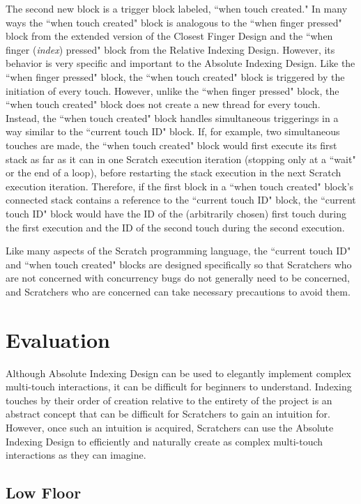 The second new block is a trigger block labeled, ``when touch created." In many ways  the ``when touch created" block is analogous to the ``when finger pressed" block from the extended version of the Closest Finger Design and the ``when finger (\emph{index}) pressed" block from the Relative Indexing Design. However, its behavior is very specific and important to the Absolute Indexing Design. Like the ``when finger pressed" block, the ``when touch created" block is triggered by the initiation of every touch. However, unlike the ``when finger pressed" block, the ``when touch created" block does not create a new thread for every touch. Instead, the ``when touch created" block handles simultaneous triggerings in a way similar to the ``current touch ID" block. If, for example, two simultaneous touches are made, the ``when touch created" block would first execute its first stack as far as it can in one Scratch execution iteration (stopping only at a ``wait" or the end of a loop), before restarting the stack execution in the next Scratch execution iteration. Therefore, if the first block in a ``when touch created" block's connected stack contains a reference to the ``current touch ID" block, the ``current touch ID" block would have the ID of the (arbitrarily chosen) first touch during the first execution and the ID of the second touch during the second execution.

Like many aspects of the Scratch programming language, the ``current touch ID" and ``when touch created" blocks are designed specifically so that Scratchers who are not concerned with concurrency bugs do not generally need to be concerned, and Scratchers who are concerned can take necessary precautions to avoid them.

\section{Evaluation}

Although Absolute Indexing Design can be used to elegantly implement complex multi-touch interactions, it can be difficult for beginners to understand. Indexing touches by their order of creation relative to the entirety  of the project is an abstract concept that can be difficult for Scratchers to gain an intuition for. However, once such an intuition is acquired, Scratchers can use the Absolute Indexing Design to efficiently and naturally create as complex multi-touch interactions as they can imagine. 

\subsection{Low Floor}


